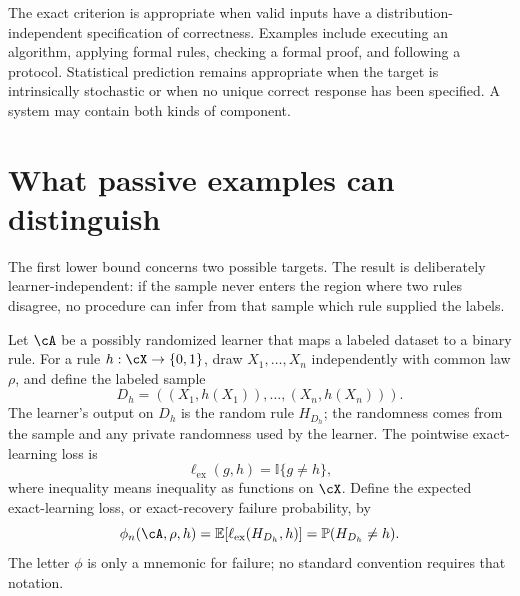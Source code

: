 \documentclass[11pt,twoside]{article}
\newcommand{\E}{\mathbb E}
\newcommand{\I}{\mathbb I}
\renewcommand{\P}{\mathbb P}
\theoremstyle{definition}
\theoremstyle{remark}
\begin{document}
The exact criterion is appropriate when valid inputs have a
distribution-independent specification of correctness. Examples include
executing an algorithm, applying formal rules, checking a formal proof, and
following a protocol. Statistical prediction remains appropriate when the
target is intrinsically stochastic or when no unique correct response has
been specified. A system may contain both kinds of component.


\section{What passive examples can distinguish}
\label{sec:pairwise}

The first lower bound concerns two possible targets. The result is deliberately
learner-independent: if the sample never enters the region where two rules
disagree, no procedure can infer from that sample which rule supplied the
labels.

Let \(\cA\) be a possibly randomized learner that maps a labeled dataset to a
binary rule. For a rule \(h:\cX\to\{0,1\}\), draw \(X_1,\ldots,X_n\)
independently with common law \(\rho\), and define the labeled sample
\begin{equation}
 D_h=((X_1,h(X_1)),\ldots,(X_n,h(X_n))).
 \label{eq:labeled-sample}
\end{equation}
The learner's output on \(D_h\) is the random rule \(H_{D_h}\); the randomness
comes from the sample and any private randomness used by the learner. The
pointwise exact-learning loss is
\begin{equation}
 \ell_{\mathrm{ex}}(g,h)=\I\{g\ne h\},
 \label{eq:exact-learning-loss}
\end{equation}
where inequality means inequality as functions on \(\cX\). Define the expected
exact-learning loss, or exact-recovery failure probability, by
\begin{equation}
 \phi_n(\cA,\rho,h)
 =\E[\ell_{\mathrm{ex}}(H_{D_h},h)]
 =\P(H_{D_h}\ne h).
 \label{eq:failure-probability}
\end{equation}
The letter \(\phi\) is only a mnemonic for failure; no standard convention
requires that notation.
\end{document}

